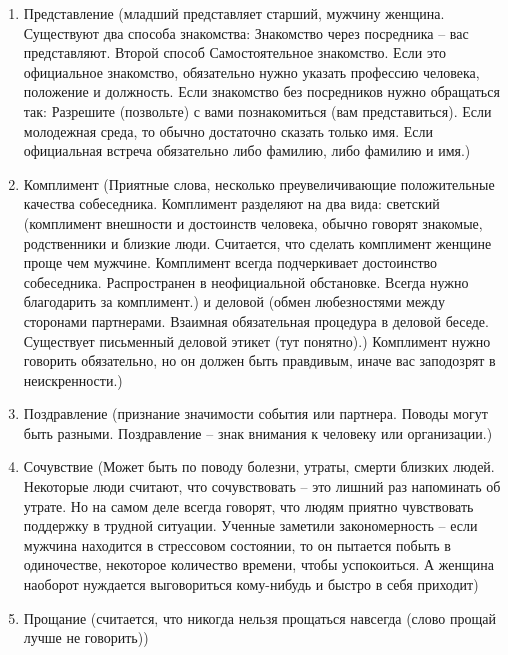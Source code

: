 \begin{enumerate}
\item Представление (младший представляет старший, мужчину женщина. Существуют два способа знакомства: Знакомство через посредника – вас представляют. Второй способ Самостоятельное знакомство. Если это официальное знакомство, обязательно нужно указать профессию человека, положение и должность. Если знакомство без посредников нужно обращаться так: Разрешите (позвольте) с вами познакомиться (вам представиться). Если молодежная среда, то обычно достаточно сказать только имя. Если официальная встреча обязательно либо фамилию, либо фамилию и имя.)
\item Комплимент (Приятные слова, несколько преувеличивающие положительные качества собеседника. Комплимент разделяют на два вида: светский (комплимент внешности и достоинств человека, обычно говорят знакомые, родственники и близкие люди. Считается, что сделать комплимент женщине проще чем мужчине. Комплимент всегда подчеркивает достоинство собеседника. Распространен в неофициальной обстановке. Всегда нужно благодарить за комплимент.) и деловой (обмен любезностями между сторонами партнерами. Взаимная обязательная процедура в деловой беседе. Существует письменный деловой этикет (тут понятно).) Комплимент нужно говорить обязательно, но он должен быть правдивым, иначе вас заподозрят в неискренности.)
\item Поздравление (признание значимости события или партнера. Поводы могут быть разными. Поздравление – знак внимания к человеку или организации.)
\item Сочувствие (Может быть по поводу болезни, утраты, смерти близких людей. Некоторые люди считают, что сочувствовать – это лишний раз напоминать об утрате. Но на самом деле всегда говорят, что людям приятно чувствовать поддержку в трудной ситуации. Ученные заметили закономерность – если мужчина находится в стрессовом состоянии, то он пытается побыть в одиночестве, некоторое количество времени, чтобы успокоиться. А женщина наоборот нуждается выговориться кому-нибудь и быстро в себя приходит)
\item Прощание (считается, что никогда нельзя прощаться навсегда (слово прощай лучше не говорить))

\end{enumerate}
